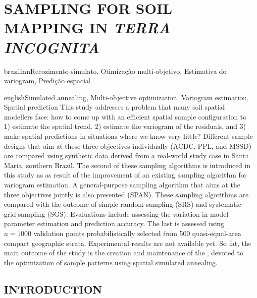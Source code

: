 \artigotrue
\chapter{SAMPLING FOR SOIL MAPPING IN \emph{TERRA INCOGNITA}}
\label{chap:chap08}

\def\ptkeys{Recozimento simulato, Otimização multi-objetivo, Estimativa do variogram, Predição espacial}

\begin{chapterabstract}{brazilian}{\ptkeys}

\end{chapterabstract}

\def\enkeys{Simulated annealing, Multi-objective optimization, Variogram estimation, Spatial prediction}
  
\begin{chapterabstract}{english}{\enkeys}
This study addresses a problem that many soil spatial modellers face: how to come up with an efficient spatial 
sample configuration to 1) estimate the spatial trend, 2) estimate the variogram of the residuals, and 3) make 
spatial predictions in situations where we know very little? Different sample designs that aim at these three
objectives individually (ACDC, PPL, and MSSD) are compared using synthetic data derived from a real-world 
study case in Santa Maria, southern Brazil. The second of these sampling algorithms is introduced in this 
study as as result of the improvement of an existing sampling algorithm for variogram estimation. A 
general-purpose sampling algorithm that aims at the three objectives jointly is also presented (SPAN). These 
sampling algorithms are compared with the outcome of simple random sampling (SRS) and systematic grid sampling 
(SGS). Evaluations include assessing the variation in model parameter estimation and prediction accuracy. The 
last is assessed using $n = 1000$ validation points probabilistically selected from 500 quasi-equal-area 
compact geographic strata. Experimental results are not available yet. So fat, the main outcome of the study 
is the creation and maintenance of the , devoted to the optimization of sample patterns using 
spatial simulated annealing.
\end{chapterabstract}

\formatchapter

\section{INTRODUCTION}

